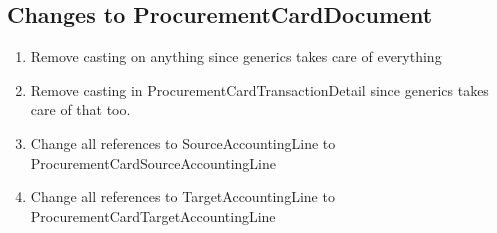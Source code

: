 \documentclass[12pt,notitlepage]{article}
\begin{document}
  \subsection{Changes to ProcurementCardDocument}
    \begin{enumerate}
      \item Remove casting on anything since generics takes care of everything
      \item Remove casting in ProcurementCardTransactionDetail since generics takes care of that too.
      \item Change all references to SourceAccountingLine to ProcurementCardSourceAccountingLine
      \item Change all references to TargetAccountingLine to ProcurementCardTargetAccountingLine
   \end{enumerate}
\end{document}
